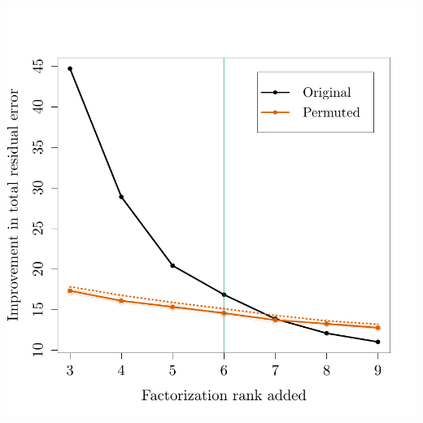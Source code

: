 \documentclass{article}\usepackage[]{graphicx}\usepackage[]{color}
\makeatletter
\def\maxwidth{ %
  \ifdim\Gin@nat@width>\linewidth
    \linewidth
  \else
    \Gin@nat@width
  \fi
}
\newenvironment{knitrout}{}{} %
\makeatother
\begin{document}
\begin{knitrout}
{\centering \includegraphics[width=\maxwidth]{figure/nmf-rank-plots-2} 

}



\end{knitrout}
\end{document}
